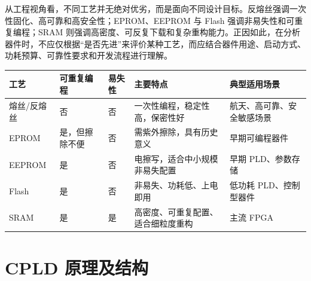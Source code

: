 从工程视角看，不同工艺并无绝对优劣，而是面向不同设计目标。反熔丝强调一次性固化、高可靠和高安全性；EPROM、EEPROM
与 Flash 强调非易失性和可重复编程；SRAM
则强调高密度、可反复下载和复杂重构能力。正因如此，在分析器件时，不应仅根据``是否先进''来评价某种工艺，而应结合器件用途、启动方式、功耗预算、可靠性要求和开发流程进行理解。

\begin{longtable}[]{@{}
  >{\raggedright\arraybackslash}p{}
  >{\raggedright\arraybackslash}p{}
  >{\raggedright\arraybackslash}p{}
  >{\raggedright\arraybackslash}p{}
  >{\raggedright\arraybackslash}p{}@{}}
\toprule\noalign{}
\begin{minipage}[b]{\linewidth}\raggedright
工艺
\end{minipage} & \begin{minipage}[b]{\linewidth}\raggedright
可重复编程
\end{minipage} & \begin{minipage}[b]{\linewidth}\raggedright
易失性
\end{minipage} & \begin{minipage}[b]{\linewidth}\raggedright
主要特点
\end{minipage} & \begin{minipage}[b]{\linewidth}\raggedright
典型适用场景
\end{minipage} \\
\midrule\noalign{}
\endhead
\bottomrule\noalign{}
\endlastfoot
熔丝/反熔丝 & 否 & 否 & 一次性编程，稳定性高，保密性好 &
航天、高可靠、安全敏感场景 \\
EPROM & 是，但擦除不便 & 否 & 需紫外擦除，具有历史意义 &
早期可编程器件 \\
EEPROM & 是 & 否 & 电擦写，适合中小规模非易失配置 & 早期
PLD、参数存储 \\
Flash & 是 & 否 & 非易失、功耗低、上电即用 & 低功耗 PLD、控制型器件 \\
SRAM & 是 & 是 & 高密度、可重复配置、适合细粒度重构 & 主流 FPGA \\
\end{longtable}

\section{CPLD 原理及结构}\label{cpld-ux539fux7406ux53caux7ed3ux6784}

